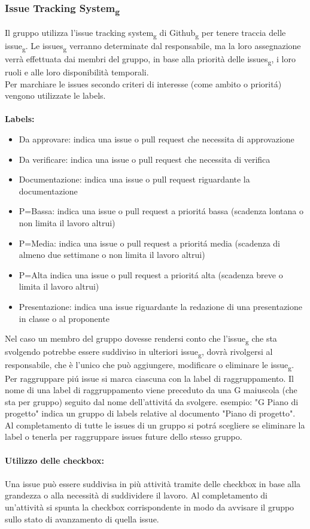 \subsubsection{Issue Tracking System\textsubscript{g}}
Il gruppo utilizza l'issue tracking system\textsubscript{g} di Github\textsubscript{g} per tenere traccia delle issue\textsubscript{g}. 
Le issues\textsubscript{g} verranno determinate dal responsabile, ma la loro assegnazione verrà effettuata dai membri del gruppo, in base alla priorità delle issues\textsubscript{g}, i loro ruoli e alle loro disponibilità temporali.\\
Per marchiare le issues secondo criteri di interesse (come ambito o prioritá) vengono utilizzate le labels.
\\\\\textbf{Labels:}
\begin{itemize}
	\item Da approvare: indica una issue o pull request che necessita di approvazione
	\item Da verificare: indica una issue o pull request che necessita di verifica
	\item Documentazione: indica una issue o pull request riguardante la documentazione
	\item P=Bassa: indica una issue o pull request a prioritá bassa (scadenza lontana o non limita il lavoro altrui)
	\item P=Media: indica una issue o pull request a prioritá media (scadenza di almeno due settimane o non limita il lavoro altrui)
	\item P=Alta indica una issue o pull request a prioritá alta (scadenza breve o limita il lavoro altrui)
	\item Presentazione: indica una issue riguardante la redazione di una presentazione in classe o al proponente
\end{itemize}

Nel caso un membro del gruppo dovesse rendersi conto che l'issue\textsubscript{g} che sta svolgendo potrebbe essere suddiviso in ulteriori issue\textsubscript{g}, dovrà rivolgersi al responsabile, che è l'unico che può aggiungere, modificare o eliminare le issue\textsubscript{g}.\\
Per raggruppare piú issue si marca ciascuna con la label di raggruppamento.
Il nome di una label di raggruppamento viene preceduto da una G maiuscola (che sta per gruppo) seguito dal nome dell'attivitá da svolgere. esempio: "G Piano di progetto"
indica un gruppo di labels relative al documento "Piano di progetto".
Al completamento di tutte le issues di un gruppo si potrá scegliere se eliminare la label o tenerla per raggruppare issues future dello stesso gruppo.
\\\\
\textbf{Utilizzo delle checkbox:}
\\\\
Una issue può essere suddivisa in più attività tramite delle checkbox in base alla grandezza o
alla necessità di suddividere il lavoro. Al completamento di un'attività si spunta la checkbox
corrispondente in modo da avvisare il gruppo sullo stato di avanzamento di quella issue.